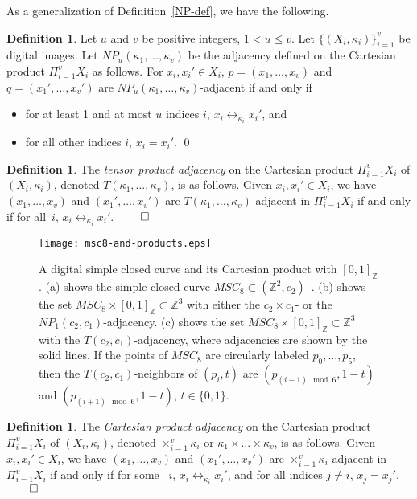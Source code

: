 \documentclass{article}
\theoremstyle{plain}
\theoremstyle{definition}
\newtheorem{definition}[thm]{Definition}
\numberwithin{thm}{section}
\newcommand{\adj}{\leftrightarrow}
\def\Z{{\mathbb Z}}
\begin{document}
As a generalization of Definition~\ref{NP-def},
we have the following.

\begin{definition}
\label{NP_u-def}
\rm{\cite{Boxer16a}}
Let $u$ and $v$ be positive integers, $1 < u \leq v$. Let $\{(X_i,\kappa_i)\}_{i=1}^v$ be
digital images. Let $NP_u(\kappa_1, \ldots, \kappa_v)$ be the adjacency
defined on the Cartesian product $\Pi_{i=1}^v X_i$ as follows.
For $x_i,x_i' \in X_i$, $p=(x_1, \ldots, x_v)$ and $q=(x_1', \ldots, x_v')$ are
$NP_u(\kappa_1, \ldots, \kappa_v)$-adjacent if and only if
\begin{itemize}
\item for at least 1 and at most $u$ indices $i$, $x_i \adj_{\kappa_i} x_i'$, and
\item for all other indices $i$, $x_i=x_i'$. \qed
\end{itemize}
\end{definition}

\begin{definition}
\label{tensor-def}
{\rm \cite{Harary&Trauth}}
The {\em tensor product adjacency} on the
Cartesian product $\Pi_{i=1}^v X_i$ of $(X_i,\kappa_i)$,
denoted $T(\kappa_1,\ldots, \kappa_v)$, is as
follows. Given $x_i,x_i' \in X_i$, we have
$(x_1,\ldots, x_v)$ and $(x_1',\ldots,x_v')$ are
$T(\kappa_1,\ldots, \kappa_v)$-adjacent in
$\Pi_{i=1}^v X_i$ if and only if for all~$i$,
$x_i \adj_{\kappa_i} x_i'$. $\qed$
\end{definition}

\begin{figure}
\texttt{[image: msc8-and-products.eps]}
\label{msc8-fig}
\caption{A digital simple closed
curve and its Cartesian product with
$[0,1]_{\Z}$.
(a) shows the simple
closed curve $MSC_8 \subset (\Z^2,c_2)$~\cite{Han03}.
(b) shows the set $MSC_8 \times [0,1]_{\Z} \subset \Z^3$ with either the $c_2 \times c_1$- or the $NP_1(c_2,c_1)$-adjacency.
(c) shows the set $MSC_8 \times [0,1]_{\Z} \subset \Z^3$ with the
$T(c_2, c_1)$-adjacency, where
adjacencies are shown by the solid lines. If the points of $MSC_8$ are circularly labeled $p_0, \ldots, p_5$,
then the $T(c_2,c_1)$-neighbors of
$(p_i, t)$ are $(p_{(i-1)\mod 6},1-t)$
and $(p_{(i+1)\mod 6},1-t)$, $t \in \{0,1\}$.
}
\end{figure}

\begin{definition}
{\rm \cite{Sabidussi60}}
\label{product-adj-def}
The {\em Cartesian product adjacency} on the
Cartesian product $\Pi_{i=1}^v X_i$ of $(X_i,\kappa_i)$,
denoted $\times_{i=1}^v \kappa_i$ or
$\kappa_1 \times \ldots \times \kappa_v$, is as
follows. Given $x_i,x_i' \in X_i$, we have
$(x_1,\ldots, x_v)$ and $(x_1',\ldots,x_v')$ are
$\times_{i=1}^v \kappa_i$-adjacent in
$\Pi_{i=1}^v X_i$ if and only if for some ~$i$,
$x_i \adj_{\kappa_i} x_i'$, and
for all indices $j \neq i$, $x_j = x_j'$. $\qed$
\end{definition}
\end{document}
